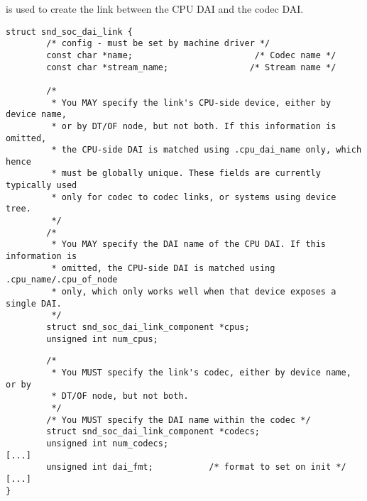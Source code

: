 \begin{frame}[fragile]{}
 is used to create the link between the
  CPU DAI and the codec DAI.
  \begin{block}{}
    \fontsize{8}{8}\selectfont
    \begin{verbatim}
struct snd_soc_dai_link {
        /* config - must be set by machine driver */
        const char *name;                        /* Codec name */
        const char *stream_name;                /* Stream name */

        /*
         * You MAY specify the link's CPU-side device, either by device name,
         * or by DT/OF node, but not both. If this information is omitted,
         * the CPU-side DAI is matched using .cpu_dai_name only, which hence
         * must be globally unique. These fields are currently typically used
         * only for codec to codec links, or systems using device tree.
         */
        /*
         * You MAY specify the DAI name of the CPU DAI. If this information is
         * omitted, the CPU-side DAI is matched using .cpu_name/.cpu_of_node
         * only, which only works well when that device exposes a single DAI.
         */
        struct snd_soc_dai_link_component *cpus;
        unsigned int num_cpus;
     \end{verbatim}
   \end{block}
\end{frame}

\begin{frame}[fragile]{}
  \begin{block}{}
    \fontsize{10}{10}\selectfont
    \begin{verbatim}
        /*
         * You MUST specify the link's codec, either by device name, or by
         * DT/OF node, but not both.
         */
        /* You MUST specify the DAI name within the codec */
        struct snd_soc_dai_link_component *codecs;
        unsigned int num_codecs;
[...]
        unsigned int dai_fmt;           /* format to set on init */
[...]
}
    \end{verbatim}
  \end{block}
\end{frame}

